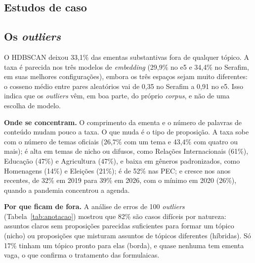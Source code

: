 \subsection{Estudos de caso}
\label{subsec:res-casos}


\subsection{Os \textit{outliers}}
\label{subsec:res-outliers}

O HDBSCAN deixou 33,1\% das ementas substantivas fora de qualquer tópico. A taxa é parecida nos três modelos de \textit{embedding} (29,9\% no e5 e 34,4\% no Serafim, em suas melhores configurações), embora os três espaços sejam muito diferentes: o cosseno médio entre pares aleatórios vai de 0,35 no Serafim a 0,91 no e5. Isso indica que os \textit{outliers} vêm, em boa parte, do próprio \textit{corpus}, e não de uma escolha de modelo.

\textbf{Onde se concentram.} O comprimento da ementa e o número de palavras de conteúdo mudam pouco a taxa. O que muda é o tipo de proposição. A taxa sobe com o número de temas oficiais (26,7\% com um tema e 43,4\% com quatro ou mais); é alta em temas de nicho ou difusos, como Relações Internacionais (61\%), Educação (47\%) e Agricultura (47\%), e baixa em gêneros padronizados, como Homenagens (14\%) e Eleições (21\%); é de 52\% nas PEC; e cresce nos anos recentes, de 32\% em 2019 para 39\% em 2026, com o mínimo em 2020 (26\%), quando a pandemia concentrou a agenda.

\textbf{Por que ficam de fora.} A análise de erros de 100 \textit{outliers} (Tabela~\ref{tab:anotacao}) mostrou que 82\% são casos difíceis por natureza: assuntos claros sem proposições parecidas suficientes para formar um tópico (nicho) ou proposições que misturam assuntos de tópicos diferentes (híbridas). Só 17\% tinham um tópico pronto para elas (borda), e quase nenhuma tem ementa vaga, o que confirma o tratamento das formulaicas.

